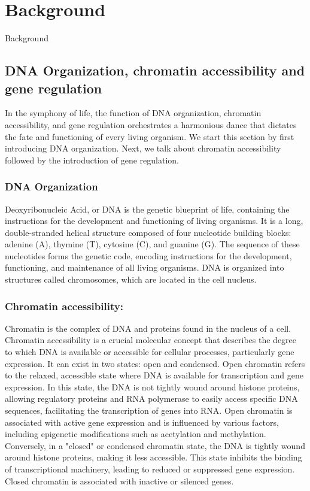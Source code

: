 \chapter{Background}
\label{cha:background}

\graphicspath{{chapter2/figs/}}

Background


\section{DNA Organization, chromatin accessibility and gene regulation}
In the symphony of life, the function of DNA organization, chromatin accessibility, and gene regulation orchestrates a harmonious dance that dictates the fate and functioning of every living organism. We start this section by first introducing DNA organization. Next, we talk about chromatin accessibility followed by the introduction of gene regulation.

\subsection{DNA Organization}
Deoxyribonucleic Acid, or DNA is the genetic blueprint of life, containing the instructions for the development and functioning of living organisms. It is a long, double-stranded helical structure composed of four nucleotide building blocks: adenine (A), thymine (T), cytosine (C), and guanine (G). The sequence of these nucleotides forms the genetic code, encoding instructions for the development, functioning, and maintenance of all living organisms. DNA is organized into structures called chromosomes, which are located in the cell nucleus.

\subsection{Chromatin accessibility:}
Chromatin is the complex of DNA and proteins found in the nucleus of a cell. Chromatin accessibility is a crucial molecular concept that describes the degree to which DNA is available or accessible for cellular processes, particularly gene expression. It can exist in two states: open and condensed. Open chromatin refers to the relaxed, accessible state where DNA is available for transcription and gene expression. In this state, the DNA is not tightly wound around histone proteins, allowing regulatory proteins and RNA polymerase to easily access specific DNA sequences, facilitating the transcription of genes into RNA. Open chromatin is associated with active gene expression and is influenced by various factors, including epigenetic modifications such as acetylation and methylation. Conversely, in a "closed" or condensed chromatin state, the DNA is tightly wound around histone proteins, making it less accessible. This state inhibits the binding of transcriptional machinery, leading to reduced or suppressed gene expression. Closed chromatin is associated with inactive or silenced genes.

